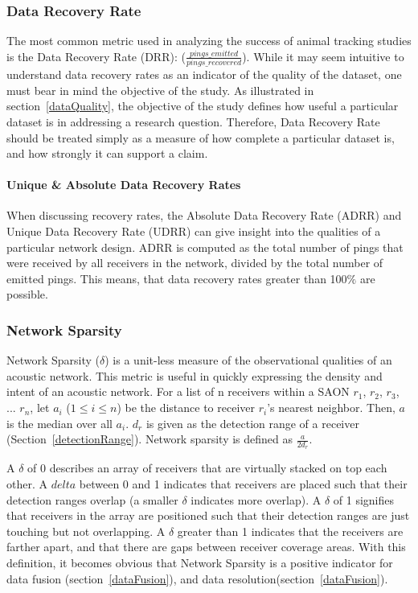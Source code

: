 \subsubsection{Data Recovery Rate}
\label{dataRecoveryRate}
The most common metric used in analyzing the success of animal tracking studies is the Data Recovery Rate (DRR): ($\frac{pings\_emitted}{pings\_recovered}$).  While it may seem intuitive to understand data recovery rates as an indicator of the quality of the dataset, one must bear in mind the objective of the study.  As illustrated in section~\ref{dataQuality}, the objective of the study defines how useful a particular dataset is in addressing a research question.  Therefore, Data Recovery Rate should be treated simply as a measure of how complete a particular dataset is, and how strongly it can support a claim.  

\paragraph{Unique \& Absolute Data Recovery Rates}
When discussing recovery rates, the Absolute Data Recovery Rate (ADRR) and Unique Data Recovery Rate (UDRR) can give insight into the qualities of a particular network design.  ADRR is computed as the total number of pings that were received by all receivers in the network, divided by the total number of emitted pings.  This means, that data recovery rates greater than 100$\%$ are possible.  

\subsubsection{Network Sparsity}
\label{delta}
Network Sparsity ($\delta$) is a unit-less measure of the observational qualities of an acoustic network.  This metric is useful in quickly expressing the density and intent of an acoustic network.  For a list of n receivers within a SAON $r_1$, $r_2$, $r_3$, ... $r_n$, let $a_i$ ($1\le i \le n$) be the distance to receiver $r_i$'s nearest neighbor.  Then, $a$ is the median over all $a_i$.  $d_r$ is given as the detection range of a receiver (Section~\ref{detectionRange}).  Network sparsity is defined as $\frac{a}{2d_r}$. \cite{EstimatingIndividual}

A $\delta$ of 0 describes an array of receivers that are virtually stacked on top each other.  A $delta$ between 0 and 1 indicates that receivers are placed such that their detection ranges overlap (a smaller $\delta$ indicates more overlap).  A $\delta$ of 1 signifies that receivers in the array are positioned such that their detection ranges are just touching but not overlapping.  A $\delta$ greater than 1 indicates that the receivers are farther apart, and that there are gaps between receiver coverage areas. \cite{EstimatingIndividual}  With this definition, it becomes obvious that Network Sparsity is a positive indicator for data fusion (section~\ref{dataFusion}), and data resolution(section~\ref{dataFusion}).


